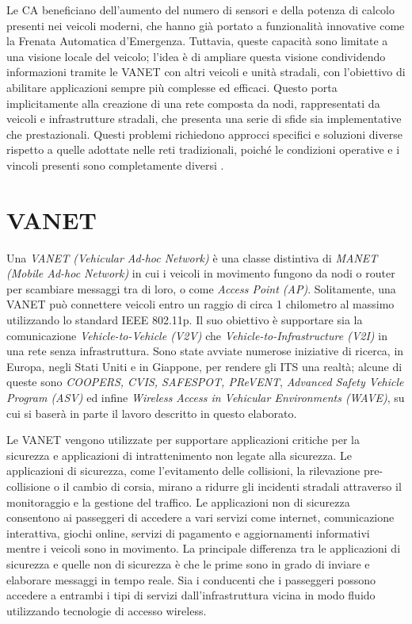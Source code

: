 Le CA beneficiano dell'aumento del numero di sensori e della potenza di calcolo presenti nei veicoli moderni, che hanno già portato a funzionalità innovative come la Frenata Automatica d'Emergenza. Tuttavia, queste capacità sono limitate a una visione locale del veicolo; l'idea è di ampliare questa visione condividendo informazioni tramite le VANET con altri veicoli e unità stradali, con l'obiettivo di abilitare applicazioni sempre più complesse ed efficaci. 
Questo porta implicitamente alla creazione di una rete composta da nodi, rappresentati da veicoli e infrastrutture stradali, che presenta una serie di sfide sia implementative che prestazionali. Questi problemi richiedono approcci specifici e soluzioni diverse rispetto a quelle adottate nelle reti tradizionali, poiché le condizioni operative e i vincoli presenti sono completamente diversi \cite{risma2021implementation}.

\section{VANET}
Una \textit{VANET (Vehicular Ad-hoc Network)} è una classe distintiva di \textit{MANET (Mobile Ad-hoc Network)} in cui i veicoli in movimento fungono da nodi o router per scambiare messaggi tra di loro, o come \textit{Access Point (AP)}. Solitamente, una VANET può connettere veicoli entro un raggio di circa 1 chilometro al massimo utilizzando lo standard IEEE 802.11p. Il suo obiettivo è supportare sia la comunicazione \textit{Vehicle-to-Vehicle (V2V)} che \textit{Vehicle-to-Infrastructure (V2I)} in una rete senza infrastruttura. Sono state avviate numerose iniziative di ricerca, in Europa, negli Stati Uniti e in Giappone, per rendere gli ITS una realtà; alcune di queste sono \textit{COOPERS, CVIS, SAFESPOT, PReVENT}, \textit{Advanced Safety Vehicle Program (ASV)} ed infine \textit{Wireless Access in Vehicular Environments (WAVE)}, su cui si baserà in parte il lavoro descritto in questo elaborato.

Le VANET vengono utilizzate per supportare applicazioni critiche per la sicurezza e applicazioni di intrattenimento non legate alla sicurezza. Le applicazioni di sicurezza, come l'evitamento delle collisioni, la rilevazione pre-collisione o il cambio di corsia, mirano a ridurre gli incidenti stradali attraverso il monitoraggio e la gestione del traffico. Le applicazioni non di sicurezza consentono ai passeggeri di accedere a vari servizi come internet, comunicazione interattiva, giochi online, servizi di pagamento e aggiornamenti informativi mentre i veicoli sono in movimento. La principale differenza tra le applicazioni di sicurezza e quelle non di sicurezza è che le prime sono in grado di inviare e elaborare messaggi in tempo reale. Sia i conducenti che i passeggeri possono accedere a entrambi i tipi di servizi dall'infrastruttura vicina in modo fluido utilizzando tecnologie di accesso wireless.

